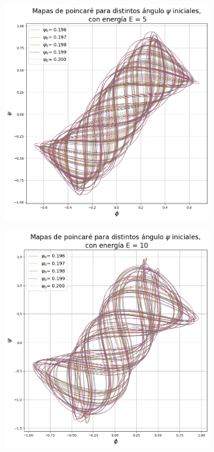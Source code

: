 \documentclass[11pt, twoside]{article} %
\begin{document}
\begin{figure}
\begin{subfigure}{.5\textwidth}
      \label{fig:poincare_estabilidad_E_3}
    \end{subfigure}
    \begin{subfigure}{.5\textwidth}
        \centering
        \includegraphics[width=\linewidth]{plots/poincare_estabilidad_E_5.png}
        \label{fig:poincare_estabilidad_E_5}
      \end{subfigure}%
      \begin{subfigure}{.5\textwidth}
        \centering
        \includegraphics[width=\linewidth]{plots/poincare_estabilidad_E_10.png}

\end{subfigure}
\end{figure}
\end{document}
